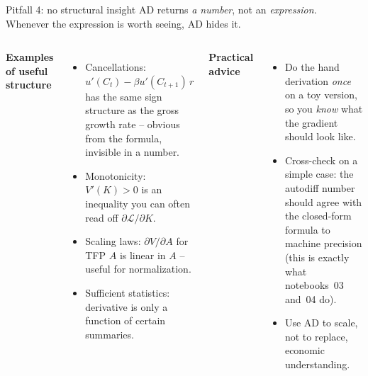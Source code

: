 \documentclass[aspectratio=169,11pt]{beamer}
\newcommand{\emphc}[1]{\textcolor{harvardcrimson}{#1}}
\begin{document}
\begin{frame}{Pitfall 4: no structural insight}
\small AD returns \emph{a number}, not an \emph{expression}. Whenever the expression is worth seeing, AD hides it.
\vspace{4pt}
\begin{columns}[t]
\textbf{Examples of useful structure}
\begin{itemize}\itemsep2pt
\item \emphc{Cancellations}: $u'(C_t) - \beta u'(C_{t+1})\,r$ has the same sign structure as the gross growth rate -- obvious from the formula, invisible in a number.
\item \emphc{Monotonicity}: $V'(K) > 0$ is an inequality you can often read off $\partial \mathcal{L}/\partial K$.
\item \emphc{Scaling laws}: $\partial V/\partial A$ for TFP $A$ is linear in $A$ -- useful for normalization.
\item \emphc{Sufficient statistics}: derivative is only a function of certain summaries.
\end{itemize}
\textbf{Practical advice}
\begin{itemize}\itemsep2pt
\item Do the hand derivation \emph{once} on a toy version, so you \emph{know} what the gradient should look like.
\item Cross-check on a simple case: the autodiff number should agree with the closed-form formula to machine precision (this is exactly what notebooks~03 and~04 do).
\item Use AD to scale, not to replace, economic understanding.
\end{itemize}
\end{columns}
\end{frame}
\end{document}
